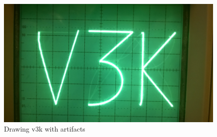\begin{figure}[h]
	    \includegraphics[width=\linewidth]{images/artifacts.jpg}
	    \caption{Drawing v3k with artifacts}
	    \label{fig:artifact}
\end{figure}
